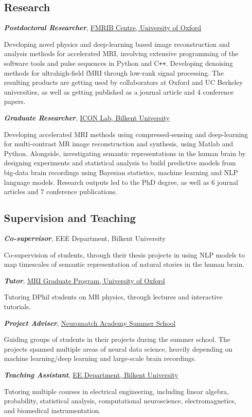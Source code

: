 \documentclass[10pt, a4paper]{article}
\newcommand{\note}[1]{\hspace*{5mm} \begin{minipage}{\dimexpr\textwidth-20pt} \small #1 \end{minipage} \newline}
\newcommand{\years}[1]{\marginnote{\scriptsize #1}}
\begin{document}
\subsection*{Research}
\years{2020-23}\textbf{\emph{Postdoctoral Researcher}}, \href{https://www.win.ox.ac.uk/research/physics-research}{FMRIB Centre, University of Oxford}\\
\note{
Developing novel physics and deep-learning based image reconstruction and analysis methods for accelerated MRI, involving extensive programming of the software tools and pulse sequences in Python and C\texttt{++}. Developing denoising methods for ultrahigh-field fMRI through low-rank signal processing. The resulting products are getting used by collaborators at Oxford and UC Berkeley universities, as well as getting published as a journal article and 4 conference papers. \\}
\years{2014-22}\textbf{\emph{Graduate Researcher}}, \href{http://www.icon.bilkent.edu.tr}{ICON Lab, Bilkent University}\\
\note{Developing accelerated MRI methods using compressed-sensing and deep-learning for multi-contrast MR image reconstruction and synthesis, using Matlab and Python. Alongside, investigating semantic representations in the human brain by designing experiments and statistical analysis to build predictive models from big-data brain recordings using Bayesian statistics, machine learning and NLP language models. Research outputs led to the PhD degree, as well as 6 journal articles and 7 conference publications.}
\subsection*{Supervision and Teaching}
\years{2020-21}\textbf{\emph{Co-supervisor}}, EEE Department, Bilkent University\\
\note{Co-supervision of students, through their thesis projects in using NLP models to map timescales of semantic representation of natural stories in the human brain.}
\years{2020-22}\textbf{\emph{Tutor}}, \href{https://www.ndcn.ox.ac.uk/study-with-us/graduate-students/fmrib-graduate-programme/course-descriptions}{MRI Graduate Program, University of Oxford}\\
\note{Tutoring DPhil students on MR physics, through lectures and interactive tutorials.}
\years{2021-22}\textbf{\emph{Project Adviser}}, \href{https://compneuro.neuromatch.io/index.html}{Neuromatch Academy Summer School}\\
\note{Guiding groups of students in their projects during the summer school. The projects spanned multiple areas of neural data science, heavily depending on machine learning/deep learning and large-scale brain recordings.}
\years{2014-20}\textbf{\emph{Teaching Assistant}}, \href{http://www.ee.bilkent.edu.tr/en/}{EE Department, Bilkent University}\\
\note{Tutoring multiple courses in electrical engineering, including linear algebra, probability, statistical analysis, computational neuroscience, electromagnetics, and biomedical instrumentation.}
\newpage
\end{document}
